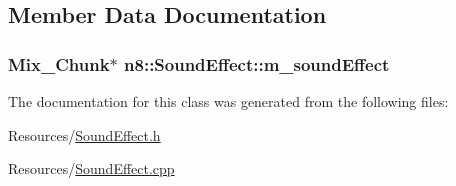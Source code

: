 \subsection{Member Data Documentation}
\hypertarget{classn8_1_1_sound_effect_a5faa9a06016c7cef864ccb8d27740a33}{
\subsubsection[{m\-\_\-sound\-Effect}]{\setlength{\rightskip}{0pt plus 5cm}Mix\-\_\-\-Chunk$\ast$ n8\-::\-Sound\-Effect\-::m\-\_\-sound\-Effect\hspace{0.3cm}{\ttfamily [private]}}}\label{classn8_1_1_sound_effect_a5faa9a06016c7cef864ccb8d27740a33}


The documentation for this class was generated from the following files\-:\begin{DoxyCompactItemize}
\item 
Resources/\hyperlink{_sound_effect_8h}{Sound\-Effect.\-h}\item 
Resources/\hyperlink{_sound_effect_8cpp}{Sound\-Effect.\-cpp}\end{DoxyCompactItemize}
